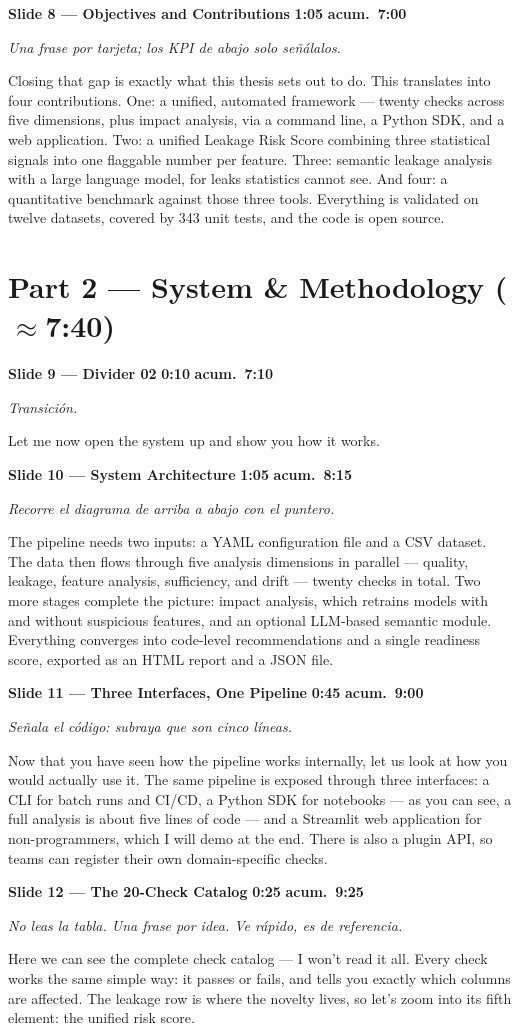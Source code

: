 \documentclass[11pt,a4paper]{article}
\newcommand{\slide}[6]{%
\begin{mdframed}[backgroundcolor=paleBlue, linecolor=upmBlue, linewidth=1pt,
                 roundcorner=4pt, skipabove=10pt, skipbelow=2pt,
                 innertopmargin=6pt, innerbottommargin=6pt]
\textbf{\color{upmBlue}Slide #1 --- #2}\hfill
\colorbox{upmOrange}{\color{white}\small\textbf{ #3 }}\;%
\colorbox{upmBlue}{\color{white}\small\textbf{ acum.\ #4 }}
\end{mdframed}
{\small\itshape\color{grayTxt}#5}\par\vspace{2pt}
#6\par\vspace{6pt}}
\begin{document}
\slide{8}{Objectives and Contributions}{1:05}{7:00}
{Una frase por tarjeta; los KPI de abajo solo señálalos.}
{Closing that gap is exactly what this thesis sets out to do. This
translates into four contributions. One: a unified, automated framework
--- twenty checks across five dimensions, plus impact analysis, via a command
line, a Python SDK, and a web application. Two: a unified Leakage Risk Score
combining three statistical signals into one flaggable number per feature.
Three: semantic leakage analysis with a large language model, for leaks
statistics cannot see. And four: a quantitative benchmark against those three
tools. Everything is validated on twelve datasets, covered by 343 unit tests,
and the code is open source.}

\section*{\color{upmBlue}Part 2 --- System \& Methodology (\normalfont$\approx$7:40)}

\slide{9}{Divider 02}{0:10}{7:10}
{Transición.}
{Let me now open the system up and show you how it works.}

\slide{10}{System Architecture}{1:05}{8:15}
{Recorre el diagrama de arriba a abajo con el puntero.}
{The pipeline needs two inputs: a YAML configuration file and a CSV dataset.
The data then flows through five analysis dimensions in parallel --- quality,
leakage, feature analysis, sufficiency, and drift --- twenty checks in total.
Two more stages complete the picture: impact analysis, which retrains models
with and without suspicious features, and an optional LLM-based semantic
module. Everything converges into code-level recommendations and a single
readiness score, exported as an HTML report and a JSON file.}

\slide{11}{Three Interfaces, One Pipeline}{0:45}{9:00}
{Señala el código: subraya que son cinco líneas.}
{Now that you have seen how the pipeline works internally, let us look at how
you would actually use it. The same pipeline is exposed through three interfaces: a CLI for batch runs
and CI/CD, a Python SDK for notebooks --- as you can see, a full analysis is
about five lines of code --- and a Streamlit web application for
non-programmers, which I will demo at the end. There is also a plugin API, so
teams can register their own domain-specific checks.}

\slide{12}{The 20-Check Catalog}{0:25}{9:25}
{No leas la tabla. Una frase por idea. Ve rápido, es de referencia.}
{Here we can see the complete check catalog --- I won't read it all. Every
check works the same simple way: it passes or fails, and tells you exactly
which columns are affected. The leakage row is where the novelty lives, so
let's zoom into its fifth element: the unified risk score.}
\end{document}
